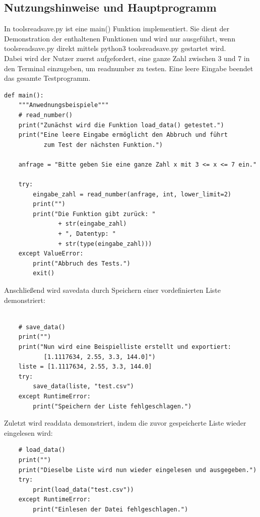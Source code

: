 \documentclass{scrreprt}
\begin{document}
\subsection{Nutzungshinweise und Hauptprogramm}
In tools\textunderscore read\textunderscore save.py ist eine main() Funktion implementiert. Sie dient der Demonstration der
enthaltenen Funktionen und wird nur ausgeführt, wenn tools\textunderscore read\textunderscore save.py direkt mittels python3 tools\textunderscore read\textunderscore save.py gestartet wird. \\

\noindent Dabei wird der Nutzer zuerst aufgefordert, eine ganze Zahl zwischen 3 und 7 in den Terminal einzugeben, um read\textunderscore number zu testen. Eine leere Eingabe beendet das gesamte Testprogramm.

\begin{lstlisting}
def main():
    """Anwednungsbeispiele"""
    # read_number()
    print("Zunächst wird die Funktion load_data() getestet.")
    print("Eine leere Eingabe ermöglicht den Abbruch und führt 
           zum Test der nächsten Funktion.")

    anfrage = "Bitte geben Sie eine ganze Zahl x mit 3 <= x <= 7 ein."
    
    try: 
        eingabe_zahl = read_number(anfrage, int, lower_limit=2)
        print("")
        print("Die Funktion gibt zurück: " 
               + str(eingabe_zahl) 
               + ", Datentyp: " 
               + str(type(eingabe_zahl)))
    except ValueError:
        print("Abbruch des Tests.")
        exit()
\end{lstlisting}

\noindent Anschließend wird save\textunderscore data durch Speichern einer vordefinierten Liste demonstriert: 

\begin{lstlisting}

    # save_data()
    print("")
    print("Nun wird eine Beispielliste erstellt und exportiert:
           [1.1117634, 2.55, 3.3, 144.0]")
    liste = [1.1117634, 2.55, 3.3, 144.0]
    try:
        save_data(liste, "test.csv")
    except RuntimeError:
        print("Speichern der Liste fehlgeschlagen.")
\end{lstlisting}

\noindent Zuletzt wird read\textunderscore data demonstriert, indem die zuvor gespeicherte Liste wieder eingelesen wird:

\begin{lstlisting}
    # load_data()
    print("")
    print("Dieselbe Liste wird nun wieder eingelesen und ausgegeben.")
    try:
        print(load_data("test.csv"))
    except RuntimeError:
        print("Einlesen der Datei fehlgeschlagen.")
\end{lstlisting}
\end{document}
